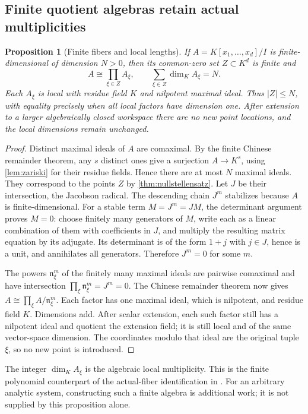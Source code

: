 \documentclass[11pt,letterpaper]{article}
\numberwithin{equation}{section}
\newtheorem{proposition}[theorem]{Proposition}
\theoremstyle{definition}
\theoremstyle{remark}\newtheorem{remark}[theorem]{Remark}
\begin{document}
\subsection{Finite quotient algebras retain actual multiplicities}
\begin{proposition}[Finite fibers and local lengths]\label{prop:finitealgebra}
If $A=K[x_1,\ldots,x_d]/I$ is finite-dimensional of dimension $N>0$,
then its common-zero set $Z\subset K^d$ is finite and
\[
 A\cong\prod_{\xi\in Z}A_\xi,
 \qquad
 \sum_{\xi\in Z}\dim_K A_\xi=N.
\]
Each $A_\xi$ is local with residue field $K$ and nilpotent maximal
ideal. Thus $|Z|\le N$, with equality precisely when all local factors
have dimension one. After extension to a larger algebraically closed
workspace there are no new point locations, and the local dimensions
remain unchanged.
\end{proposition}
\begin{proof}
Distinct maximal ideals of $A$ are comaximal. By the finite Chinese
remainder theorem, any $s$ distinct ones give a surjection $A\to K^s$,
using \cref{lem:zariski} for their residue fields. Hence there are at
most $N$ maximal ideals. They correspond to the points $Z$ by
\cref{thm:nullstellensatz}. Let $J$ be their intersection, the
Jacobson radical. The descending chain $J^m$ stabilizes because $A$
is finite-dimensional. For a stable term $M=J^m=JM$, the determinant
argument proves $M=0$: choose finitely many generators of $M$, write
each as a linear combination of them with coefficients in $J$, and
multiply the resulting matrix equation by its adjugate. Its determinant
is of the form $1+j$ with $j\in J$, hence is a unit, and annihilates
all generators. Therefore $J^m=0$ for some $m$.

The powers $\mathfrak n_\xi^m$ of the finitely many maximal ideals
are pairwise comaximal and have intersection
$\prod_\xi\mathfrak n_\xi^m=J^m=0$. The Chinese remainder theorem
now gives $A\cong\prod_\xi A/\mathfrak n_\xi^m$. Each factor has
one maximal ideal, which is nilpotent, and residue field $K$.
Dimensions add. After scalar extension, each such factor still has
a nilpotent ideal and quotient the extension field; it is still local
and of the same vector-space dimension. The coordinates modulo that
ideal are the original tuple $\xi$, so no new point is introduced.
\end{proof}
The integer $\dim_K A_\xi$ is the algebraic local multiplicity.
This is the finite polynomial counterpart of the actual-fiber
identification in \cite{SourceResearch}. For an arbitrary analytic
system, constructing such a finite algebra is additional work; it is
not supplied by this proposition alone.
\end{document}
